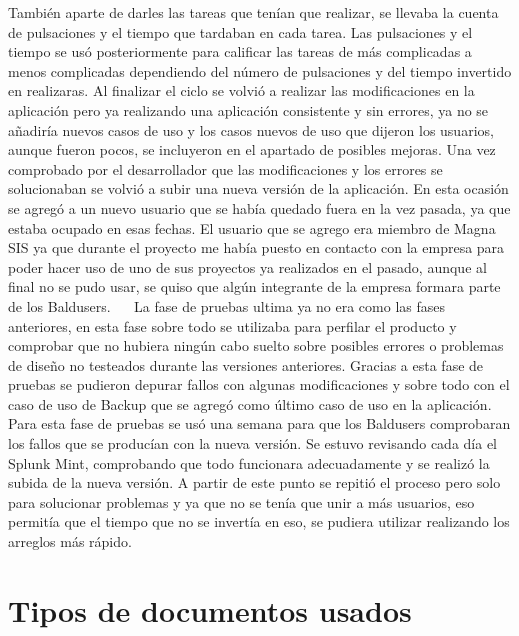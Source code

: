También aparte de darles las tareas que tenían que realizar, se llevaba la cuenta de pulsaciones y el tiempo que tardaban en cada tarea.
Las pulsaciones y el tiempo se usó posteriormente para calificar las tareas de más complicadas a menos complicadas dependiendo del número de pulsaciones y del tiempo invertido en realizaras.
Al finalizar el ciclo se volvió a realizar las modificaciones en la aplicación pero ya realizando una aplicación consistente y sin errores, ya no se añadiría nuevos casos de uso y los casos nuevos de uso que dijeron los usuarios, aunque fueron pocos, se incluyeron en el apartado de posibles mejoras.
Una vez comprobado por el desarrollador que las modificaciones y los errores se solucionaban se volvió a subir una nueva versión de la aplicación. En esta ocasión se agregó a un nuevo usuario que se había quedado fuera en la vez pasada, ya que estaba ocupado en esas fechas.
El usuario que se agrego era miembro de Magna SIS ya que durante el proyecto me había puesto en contacto con la empresa para poder hacer uso de uno de sus proyectos ya realizados en el pasado, aunque al final no se pudo usar, se quiso que algún integrante de la empresa formara parte de los Baldusers.
 
La fase de pruebas ultima ya no era como las fases anteriores, en esta fase sobre todo se utilizaba para perfilar el producto y comprobar que no hubiera ningún cabo suelto sobre posibles errores o problemas de diseño no testeados durante las versiones anteriores.
Gracias a esta fase de pruebas se pudieron depurar fallos con algunas modificaciones y sobre todo con el caso de uso de Backup que se agregó como último caso de uso en la aplicación.
Para esta fase de pruebas se usó una semana para que los Baldusers comprobaran los fallos que se producían con la nueva versión.
Se estuvo revisando cada día el Splunk Mint, comprobando que todo funcionara adecuadamente y se realizó la subida de la nueva versión.
A partir de este punto se repitió el proceso pero solo para solucionar problemas y ya que no se tenía que unir a más usuarios, eso permitía que el tiempo que no se invertía en eso, se pudiera utilizar realizando los arreglos más rápido.


\section{Tipos de documentos usados}
\label{secc:tipos de documentos usados}

